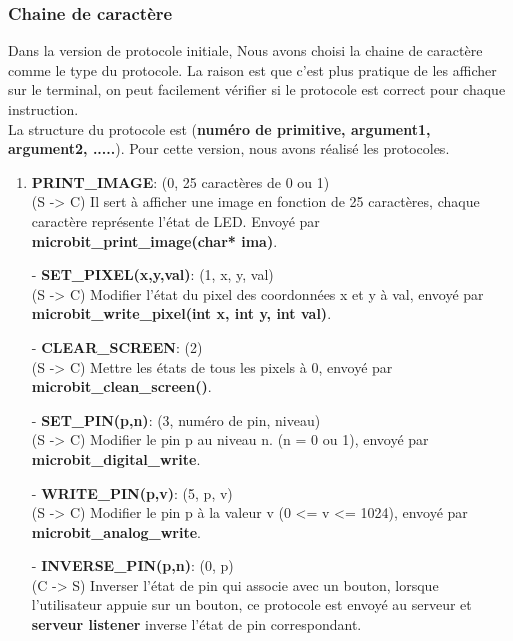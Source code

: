 \documentclass[14px]{article}
\begin{document}
	\subsubsection{Chaine de caractère}
	Dans la version de protocole initiale, Nous avons choisi la chaine de caractère comme le type du protocole. La raison est que c'est plus pratique de les afficher sur le terminal, on peut facilement vérifier si le protocole est correct pour chaque instruction. \\
	La structure du protocole est (\textbf{numéro de primitive, argument1, argument2, .....}).
	Pour cette version, nous avons réalisé les protocoles.
	\begin{enumerate}
		\item \textbf{PRINT\_IMAGE}: (0, 25 caractères de 0 ou 1)\\
		(S -> C) Il sert à afficher une image en fonction de 25 caractères, chaque caractère représente l'état de LED. Envoyé par \textbf{microbit\_print\_image(char* ima)}.
		\item[-] \textbf{SET\_PIXEL(x,y,val)}: (1, x, y, val)\\
		(S -> C) Modifier l'état du pixel des coordonnées x et y à val, envoyé par \textbf{microbit\_write\_pixel(int x, int y, int val)}.
		\item[-] \textbf{CLEAR\_SCREEN}: (2)\\
		(S -> C) Mettre les états de tous les pixels à 0, envoyé par \textbf{microbit\_clean\_screen()}.
		\item[-] \textbf{SET\_PIN(p,n)}: (3, numéro de pin, niveau)\\
		(S -> C) Modifier le pin p au niveau n. (n = 0 ou 1), envoyé par \textbf{microbit\_digital\_write}.
		\item[-] \textbf{WRITE\_PIN(p,v)}: (5, p, v)\\
		(S -> C) Modifier le pin p à la valeur v (0 <= v <= 1024), envoyé par \textbf{microbit\_analog\_write}.\\
		
		\item[-] \textbf{INVERSE\_PIN(p,n)}: (0, p)\\
		(C -> S) Inverser l'état de pin qui associe avec un bouton, lorsque l'utilisateur appuie sur un bouton, ce protocole est envoyé au serveur et \textbf{serveur listener} inverse l'état de pin correspondant.
	\end{enumerate}
	
\end{document}
